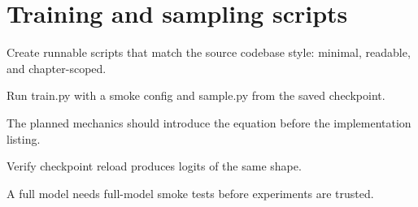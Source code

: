 \section{Training and sampling scripts}
\label{sec:ch10-training-and-sampling-scripts}

Create runnable scripts that match the source codebase style: minimal, readable, and chapter-scoped.



Run train.py with a smoke config and sample.py from the saved checkpoint.



The planned mechanics should introduce the equation before the implementation listing.





\begin{checkpointbox}
Verify checkpoint reload produces logits of the same shape.
\end{checkpointbox}

A full model needs full-model smoke tests before experiments are trusted.
